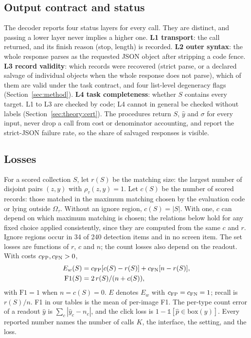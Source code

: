 \subsection{Output contract and status}\label{sec:setup:contract}
The decoder reports four status layers for every call. They are distinct, and passing a lower layer never implies a higher one.
\textbf{L1 transport}: the call returned, and its finish reason (stop, length) is recorded.
\textbf{L2 outer syntax}: the whole response parses as the requested JSON object after stripping a code fence.
\textbf{L3 record validity}: which records were recovered (strict parse, or a declared salvage of individual objects when the whole response does not parse), which of them are valid under the task contract, and four list-level degeneracy flags (Section~\ref{sec:method}).
\textbf{L4 task completeness}: whether $S$ contains every target. L1 to L3 are checked by code; L4 cannot in general be checked without labels (Section~\ref{sec:theory:cert}).
The procedures return $S$, $\hat y$ and $\sigma$ for every input, never drop a call from cost or denominator accounting, and report the strict-JSON failure rate, so the share of salvaged responses is visible.

\subsection{Losses}\label{sec:setup:loss}
For a scored collection $S$, let $r(S)$ be the matching size: the largest number of disjoint pairs $(z,y)$ with $\rho_\tau(z,y)=1$. Let $c(S)$ be the number of scored records: those matched in the maximum matching chosen by the evaluation code or lying outside $\Omega_\tau$. Without an ignore region, $c(S)=|S|$. With one, $c$ can depend on which maximum matching is chosen; the relations below hold for any fixed choice applied consistently, since they are computed from the same $c$ and $r$. Ignore regions occur in 34 of 240 detection items and in no screen item. The set losses are functions of $r$, $c$ and $n$; the count losses also depend on the readout. With costs $c_{\mathrm{FP}},c_{\mathrm{FN}}>0$,
\begin{align*}
E_w(S)&=c_{\mathrm{FP}}[c(S)-r(S)]+c_{\mathrm{FN}}[n-r(S)],\\
\mathrm{F1}(S)&=2\,r(S)/(n+c(S)),
\end{align*}
with $\mathrm{F1}=1$ when $n=c(S)=0$. $E$ denotes $E_w$ with $c_{\mathrm{FP}}=c_{\mathrm{FN}}=1$; recall is $r(S)/n$. F1 in our tables is the mean of per-image F1. The per-type count error of a readout $\hat y$ is $\sum_c|\hat y_c-n_c|$, and the click loss is $1-\mathbb{1}[\hat p\in\mathrm{box}(y)]$. Every reported number names the number of calls $K$, the interface, the setting, and the loss.
